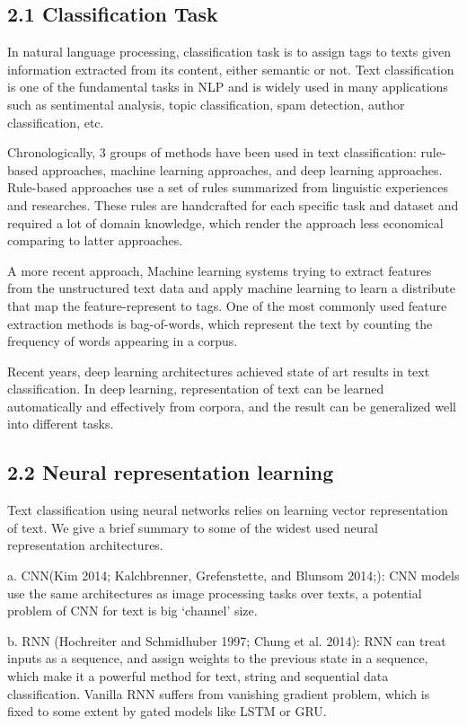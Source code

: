 \documentclass[10pt]{article}
\begin{document}
\subsection*{2.1 Classification Task}
In natural language processing, classification task is to assign tags to texts given information extracted from its content, either semantic or not. Text classification is one of the fundamental tasks in NLP and is widely used in many applications such as sentimental analysis, topic classification, spam detection, author classification, etc.  

Chronologically, 3 groups of methods have been used in text classification: rule-based approaches, machine learning approaches, and deep learning approaches.
Rule-based approaches use a set of rules summarized from linguistic experiences and researches. These rules are handcrafted for each specific task and dataset and required a lot of domain knowledge, which render the approach less economical comparing to latter approaches.

A more recent approach, Machine learning systems trying to extract features from the unstructured text data and apply machine learning to learn a distribute that map the feature-represent to tags. One of the most commonly used feature extraction methods is bag-of-words, which represent the text by counting the frequency of words appearing in a corpus.

Recent years, deep learning architectures achieved state of art results in text classification. In deep learning, representation of text can be learned automatically and effectively from corpora, and the result can be generalized well into different tasks.

\subsection*{2.2 Neural representation learning}

Text classification using neural networks relies on learning vector representation of text. We give a brief summary to some of the widest used neural representation architectures.

a.	CNN\cite{DBLP:conf/emnlp/Kim14}\cite{DBLP:conf/acl/KalchbrennerGB14}(Kim 2014; Kalchbrenner, Grefenstette, and Blunsom 2014;): CNN models use the same architectures as image processing tasks over texts, a potential problem of CNN for text is big ‘channel’ size.

b.	RNN \cite{DBLP:journals/neco/HochreiterS97}\cite{DBLP:journals/corr/ChungGCB14}(Hochreiter and Schmidhuber 1997; Chung et al. 2014): RNN can treat inputs as a sequence, and assign weights to the previous state in a sequence, which make it a powerful method for text, string and sequential data classification. Vanilla RNN suffers from vanishing gradient problem, which is fixed to some extent by gated models like LSTM or GRU. 
\end{document}
